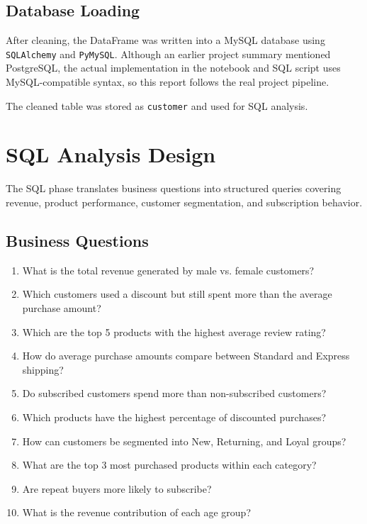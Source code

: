 \documentclass[12pt,a4paper]{article}
\begin{document}
\subsection{Database Loading}
After cleaning, the DataFrame was written into a MySQL database using \texttt{SQLAlchemy} and \texttt{PyMySQL}. Although an earlier project summary mentioned PostgreSQL, the actual implementation in the notebook and SQL script uses MySQL-compatible syntax, so this report follows the real project pipeline.

The cleaned table was stored as \texttt{customer} and used for SQL analysis.

\section{SQL Analysis Design}
The SQL phase translates business questions into structured queries covering revenue, product performance, customer segmentation, and subscription behavior.

\subsection{Business Questions}
\begin{enumerate}
  \item What is the total revenue generated by male vs. female customers?
  \item Which customers used a discount but still spent more than the average purchase amount?
  \item Which are the top 5 products with the highest average review rating?
  \item How do average purchase amounts compare between Standard and Express shipping?
  \item Do subscribed customers spend more than non-subscribed customers?
  \item Which products have the highest percentage of discounted purchases?
  \item How can customers be segmented into New, Returning, and Loyal groups?
  \item What are the top 3 most purchased products within each category?
  \item Are repeat buyers more likely to subscribe?
  \item What is the revenue contribution of each age group?
\end{enumerate}
\end{document}
